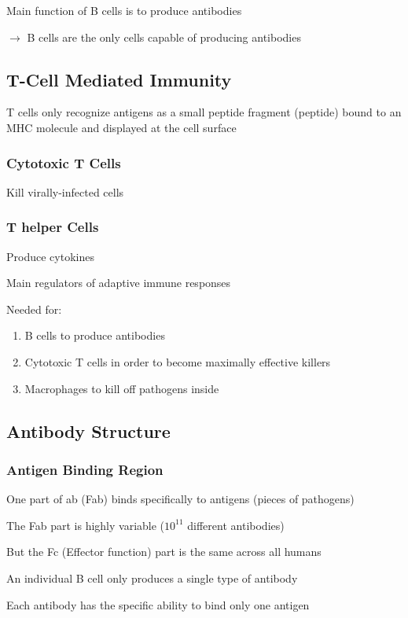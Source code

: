 \documentclass{notes}
\begin{document}
Main function of B cells is to produce antibodies

\hspace*{10px} \(\rightarrow\) B cells are the only cells capable of producing antibodies

\subsection*{T-Cell Mediated Immunity}
T cells only recognize antigens as a small peptide fragment (peptide) bound to an MHC molecule and displayed at the cell surface

\subsubsection*{Cytotoxic T Cells}
Kill virally-infected cells

\subsubsection*{T helper Cells}
Produce cytokines

\indicates Main regulators of adaptive immune responses

Needed for:
\begin{enumerate}
    \item B cells to produce antibodies
    \item Cytotoxic T cells in order to become maximally effective killers
    \item Macrophages to kill off pathogens inside
\end{enumerate}

\subsection*{Antibody Structure}
\subsubsection*{Antigen Binding Region}
One part of ab (Fab) binds specifically to antigens (pieces of pathogens)

The Fab part is highly variable (\(10^{11}\) different antibodies)

But the Fc (Effector function) part is the same across all humans

An individual B cell only produces a single type of antibody

Each antibody has the specific ability to bind only one antigen
\end{document}
